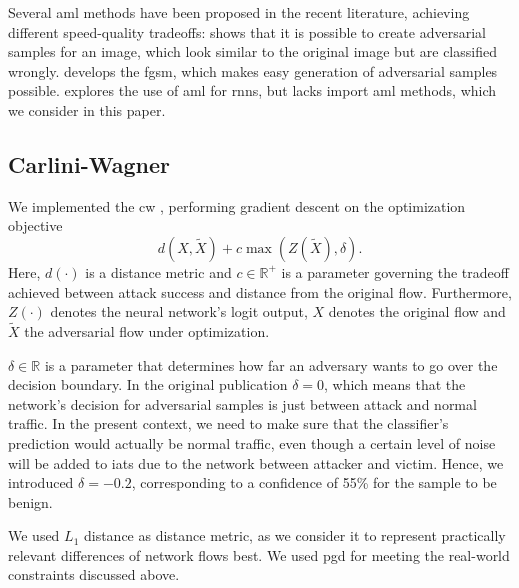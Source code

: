 \documentclass[conference]{IEEEtran}
\begin{document}
Several \gls{aml} methods have been proposed in the recent literature, achieving different speed-quality tradeoffs:
\cite{szegedy_intriguing_2014} shows that it is possible to create adversarial samples for an image, which look similar to the original image but are classified wrongly. \cite{goodfellow_explaining_2015} develops the \gls{fgsm}, which makes easy generation of adversarial samples possible. \cite{papernot_crafting_2016} explores the use of \gls{aml} for \glspl{rnn}, but lacks import \gls{aml} methods, which we consider in this paper.


\subsection{Carlini-Wagner}
We implemented the \gls{cw} \cite{carlini_towards_2017}, performing gradient descent on the optimization objective
\begin{equation} \label{eq:carliniWagner}
d(X,\tilde X) + c  \max(Z(\tilde X), \delta).
\end{equation}
Here, $d(\cdot)$ is a distance metric and $c \in \mathbb R^+$ is a parameter governing the tradeoff achieved between attack success and distance from the original flow. Furthermore, $Z(\cdot)$ denotes the neural network's logit output, $X$ denotes the original flow and $\tilde X$ the adversarial flow under optimization.

$\delta \in \mathbb R$ is a parameter that determines how far an adversary wants to go over the decision boundary.
In the original publication $\delta=0$, which means that the network's decision for adversarial samples is just between attack and normal traffic. In the present context, we need to make sure that the classifier's prediction would actually be normal traffic, even though a certain level of noise will be added to \glspl{iat} due to the network between attacker and victim. Hence, we introduced $\delta=-0.2$, corresponding to a confidence of 55\% for the sample to be benign.

We used $L_1$ distance as distance metric, as we consider it to represent practically relevant differences of network flows best. We used \gls{pgd} for meeting the real-world constraints discussed above.
\end{document}
